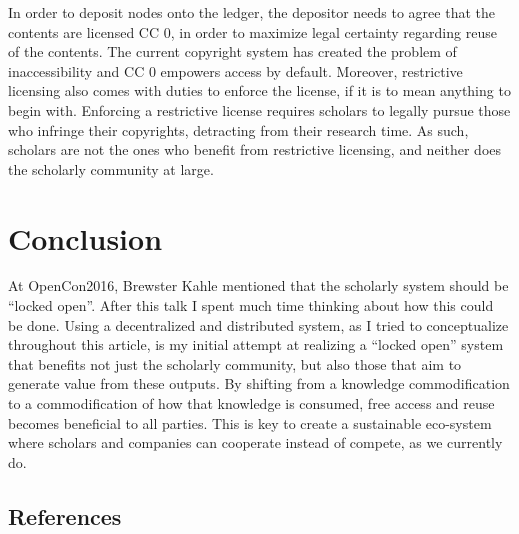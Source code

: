 \documentclass[]{tufte-book}
\begin{document}
In order to deposit nodes onto the ledger, the depositor needs to agree
that the contents are licensed CC 0, in order to maximize legal
certainty regarding reuse of the contents. The current copyright system
has created the problem of inaccessibility and CC 0 empowers access by
default. Moreover, restrictive licensing also comes with duties to
enforce the license, if it is to mean anything to begin with. Enforcing
a restrictive license requires scholars to legally pursue those who
infringe their copyrights, detracting from their research time. As such,
scholars are not the ones who benefit from restrictive licensing, and
neither does the scholarly community at large.

\chapter{Conclusion}\label{conclusion}

At OpenCon2016, Brewster Kahle mentioned that the scholarly system
should be ``locked open''. After this talk I spent much time thinking
about how this could be done. Using a decentralized and distributed
system, as I tried to conceptualize throughout this article, is my
initial attempt at realizing a ``locked open'' system that benefits not
just the scholarly community, but also those that aim to generate value
from these outputs. By shifting from a knowledge commodification to a
commodification of how that knowledge is consumed, free access and reuse
becomes beneficial to all parties. This is key to create a sustainable
eco-system where scholars and companies can cooperate instead of
compete, as we currently do.

\section{References}\label{references}


\end{document}
